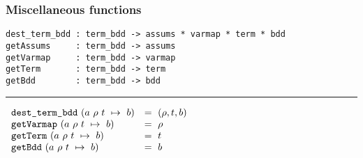 \documentclass[12pt]{book}
\renewcommand{\t}[1]{\mbox{\tt #1}}
\newcommand{\termbdd}[4]{\mbox{$#1~#2~#3~\mapsto~#4$}}
\begin{document}
\subsubsection{Miscellaneous functions}\label{misc}


\noindent \newsavebox\destructors
\begin{lrbox}\destructors
\begin{minipage}{\minipagewidth}

\begin{footnotesize}
\begin{verbatim}
dest_term_bdd : term_bdd -> assums * varmap * term * bdd
getAssums     : term_bdd -> assums
getVarmap     : term_bdd -> varmap
getTerm       : term_bdd -> term
getBdd        : term_bdd -> bdd
\end{verbatim}
\end{footnotesize}
\vspace*{-6mm}

\noindent \rule\minipagewidth{0.1pt}

\vspace*{1mm}

\begin{footnotesize}
\hspace*{-1.5mm}$\begin{array}{ll}
\t{dest\_term\_bdd}~(\termbdd{a}{\rho}{t}{b})&=~(\rho, t, b)\\
\t{getVarmap}~(\termbdd{a}{\rho}{t}{b})&=~\rho\\
\t{getTerm}~(\termbdd{a}{\rho}{t}{b})&=~t\\
\t{getBdd}~(\termbdd{a}{\rho}{t}{b})&=~b
\end{array}$
\end{footnotesize}
\end{minipage}
\end{lrbox}
\fbox{\usebox{\destructors}}

\bigskip

\noindent \newsavebox\inSupport
{}
\fbox{\usebox{\inSupport}}
\end{document}
